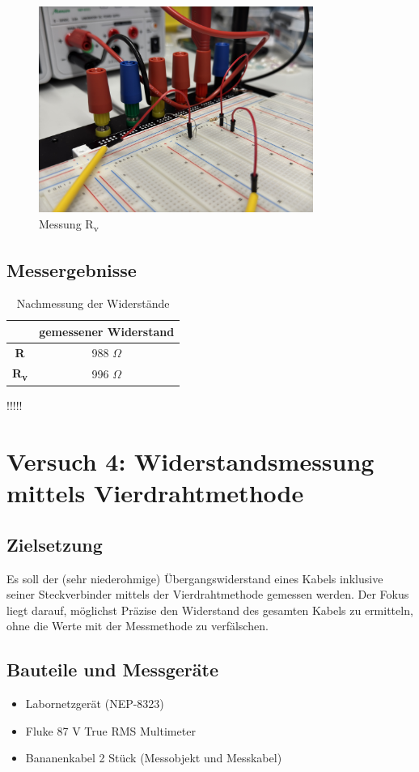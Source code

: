 \documentclass[a4paper,12pt]{article}
\begin{document}
\begin{figure}[H]
    \centering
    \includegraphics[width=0.8\textwidth]{../Quellen/Labor2/Fotos/IMG_3980.jpeg}
\caption{Messung R\textsubscript{v}}
\end{figure}


\subsection{Messergebnisse}
\begin{table}[H]
	\centering
	\begin{tabular}{|c|c|}
		\hline
		  & gemessener Widerstand\\
		\hline		
		\textbf{R} & 988 $\Omega$\\
		\hline
		\textbf{R\textsubscript{v}} & 996 $\Omega$\\
		\hline
	\end{tabular}
	\caption{Nachmessung der Widerstände}
\end{table}
!!!!!


\newpage
\section{Versuch 4: Widerstandsmessung mittels Vierdrahtmethode}
\subsection{Zielsetzung}
Es soll der (sehr niederohmige) Übergangswiderstand eines Kabels inklusive seiner Steckverbinder
mittels der Vierdrahtmethode gemessen werden. Der Fokus liegt darauf, möglichst Präzise den Widerstand des gesamten Kabels zu ermitteln, ohne die Werte mit der Messmethode zu verfälschen.

\subsection{Bauteile und Messgeräte}
\begin{itemize}
\item Labornetzgerät (NEP-8323)
\item Fluke 87 V True RMS Multimeter
\item Bananenkabel 2 Stück (Messobjekt und Messkabel)
\end{itemize}
\end{document}
